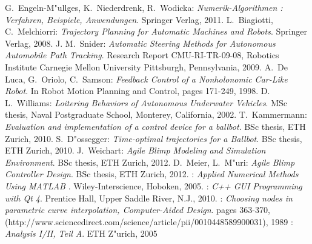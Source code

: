 \begin{thebibliography}{99}



 {\sc G.~Engeln-M"ullges, K.~Niederdrenk, R.~Wodicka}:
{\it Numerik-Algorithmen : Verfahren, Beispiele, Anwendungen}. Springer Verlag, 2011.
 {\sc L.~Biagiotti, C.~Melchiorri}:
{\it Trajectory Planning for Automatic Machines and Robots}. Springer Verlag, 2008.
 {\sc J. M.~Snider}:
{\it Automatic Steering Methods for Autonomous Automobile Path Tracking}. Research Report CMU-RI-TR-09-08, Robotics Institute Carnegie Mellon University Pittsburgh, Pennsylvania, 2009.
 {\sc A.~De Luca, G.~Oriolo, C.~Samson}:
{\it Feedback Control of a Nonholonomic Car-Like Robot}. In Robot Motion Planning and Control, pages 171-249, 1998.
 {\sc D. L.~Williams}:
{\it Loitering Behaviors of Autonomous Underwater Vehicles}. MSc thesis, Naval Postgraduate School, Monterey, California, 2002.
 {\sc T.~Kammermann}:
{\it Evaluation and implementation of a control device for a ballbot}. BSc thesis, ETH Zurich, 2010.
 {\sc S.~D"ossegger}:
{\it Time-optimal trajectories for a Ballbot}. BSc thesis, ETH Zurich, 2010.
 {\sc J.~Weichart}:
{\it Agile Blimp Modeling and Simulation Environment}. BSc thesis, ETH Zurich, 2012.
 {\sc D.~Meier, L.~M"uri}:
{\it Agile Blimp Controller Design}. BSc thesis, ETH Zurich, 2012.
:
{\it Applied Numerical Methods Using MATLAB} . Wiley-Interscience, Hoboken, 2005.
:
{\it C++ GUI Programming with Qt 4}. Prentice Hall, Upper Saddle River, N.J., 2010.
:
{\it Choosing nodes in parametric curve interpolation, Computer-Aided Design}. pages 363-370, (http://www.sciencedirect.com/science/article/pii/0010448589900031), 1989
:
{\it Analysis I/II, Teil A}. ETH Z"urich, 2005

\end{thebibliography}
